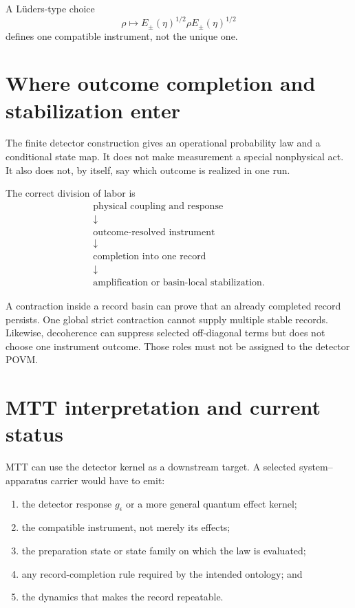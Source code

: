 \documentclass[11pt]{article}
\begin{document}
A L\"uders-type choice
\[
\rho\longmapsto
E_\pm(\eta)^{1/2}\rho E_\pm(\eta)^{1/2}
\]
defines one compatible instrument, not the unique one.

\section{Where outcome completion and stabilization enter}

The finite detector construction gives an operational probability law and a
conditional state map. It does not make measurement a special nonphysical
act. It also does not, by itself, say which outcome is realized in one run.

The correct division of labor is
\[
\boxed{
\begin{array}{c}
\text{physical coupling and response}\\
\downarrow\\
\text{outcome-resolved instrument}\\
\downarrow\\
\text{completion into one record}\\
\downarrow\\
\text{amplification or basin-local stabilization}.
\end{array}
}
\]

A contraction inside a record basin can prove that an already completed
record persists. One global strict contraction cannot supply multiple stable
records. Likewise, decoherence can suppress selected off-diagonal terms but
does not choose one instrument outcome. Those roles must not be assigned to
the detector POVM.

\section{MTT interpretation and current status}

MTT can use the detector kernel as a downstream target. A selected
system--apparatus carrier would have to emit:
\begin{enumerate}
\item the detector response \(g_\epsilon\) or a more general quantum effect
kernel;
\item the compatible instrument, not merely its effects;
\item the preparation state or state family on which the law is evaluated;
\item any record-completion rule required by the intended ontology; and
\item the dynamics that makes the record repeatable.
\end{enumerate}
\end{document}
